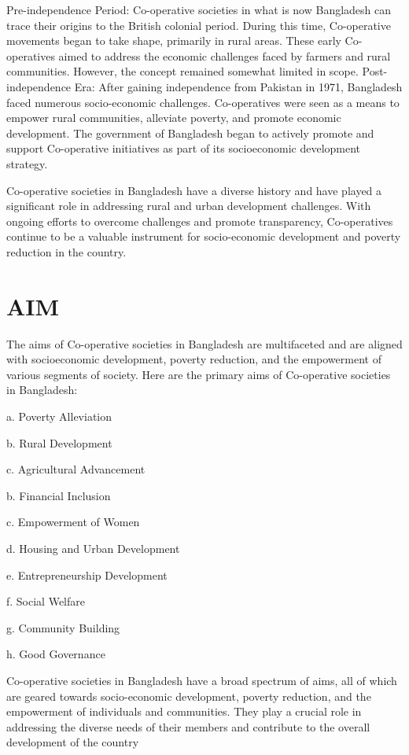 Pre-independence Period: Co-operative societies in what is now Bangladesh can trace their origins to the British colonial period. During this time, Co-operative movements began to take shape, primarily in rural areas. These early Co-operatives aimed to address the economic challenges faced by farmers and rural communities. However, the concept remained somewhat limited in scope. Post-independence Era: After gaining independence from Pakistan in 1971, Bangladesh faced numerous socio-economic challenges. Co-operatives were seen as a means to empower rural communities, alleviate poverty, and promote economic development. The government of Bangladesh began to actively promote and support Co-operative initiatives as part of its socioeconomic development strategy. 

Co-operative societies in Bangladesh have a diverse history and have played a significant role in addressing rural and urban development challenges. With ongoing efforts to overcome challenges and promote transparency, Co-operatives continue to be a valuable instrument for socio-economic development and poverty reduction in the country.


\section{AIM}
The aims of Co-operative societies in Bangladesh are multifaceted and are aligned with socioeconomic development, poverty reduction, and the empowerment of various segments of society.
Here are the primary aims of Co-operative societies in Bangladesh:

a. Poverty Alleviation

b. Rural Development

c. Agricultural Advancement

b. Financial Inclusion

c. Empowerment of Women

d. Housing and Urban Development

e. Entrepreneurship Development

f. Social Welfare

g. Community Building

h. Good Governance

Co-operative societies in Bangladesh have a broad spectrum of aims, all of which are geared
towards socio-economic development, poverty reduction, and the empowerment of individuals
and communities. They play a crucial role in addressing the diverse needs of their members and
contribute to the overall development of the country

